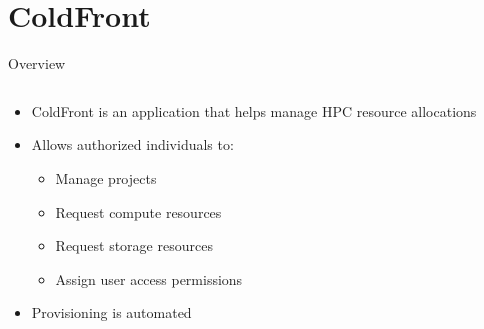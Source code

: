 \documentclass[aspectratio=169]{beamer}
\begin{document}
\section{ColdFront}


\begin{frame}{Overview}
\small
\begin{columns}[c]
\begin{column}{0.5\textwidth}
\begin{itemize}
\item<1-| alert@1> ColdFront is an application that helps manage HPC resource
allocations
\item<2-| alert@2> Allows authorized individuals to:
\begin{itemize}
\item<3-| alert@3> Manage projects
\item<4-| alert@4> Request compute resources
\item<5-| alert@5> Request storage resources
\item<6-| alert@6> Assign user access permissions
\end{itemize}
\item<7-| alert@7> Provisioning is automated
\end{itemize}
\end{column}
\begin{column}{0.5\textwidth}
\centering
{}
\end{column}
\end{columns}
\end{frame}
\end{document}
